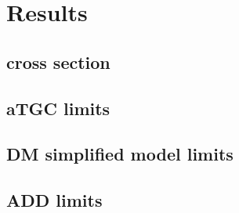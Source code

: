 \chapter{Results} \label{chap:results}
\section{\texorpdfstring{\zinvg}{Z(νν)γ} cross section} \label{sec:results_znng_xsec}
\section{aTGC limits} \label{sec:results_aTGC}
\section{DM simplified model limits} \label{sec:results_DM}
\section{ADD limits} \label{sec:results_ADD}
